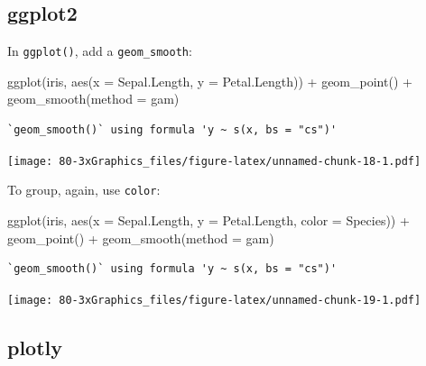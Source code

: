 \documentclass[
]{book}
\newenvironment{Shaded}{\begin{snugshade}}{\end{snugshade}}
\newcommand{\AttributeTok}[1]{\textcolor[rgb]{0.77,0.63,0.00}{#1}}
\newcommand{\FunctionTok}[1]{\textcolor[rgb]{0.00,0.00,0.00}{#1}}
\newcommand{\NormalTok}[1]{#1}
\newcommand{\SpecialCharTok}[1]{\textcolor[rgb]{0.00,0.00,0.00}{#1}}
\newcommand{\StringTok}[1]{\textcolor[rgb]{0.31,0.60,0.02}{#1}}
\begin{document}
\hypertarget{ggplot2-2}{%
\subsection{\texorpdfstring{\textbf{ggplot2}}{ggplot2}}\label{ggplot2-2}}

In \texttt{ggplot()}, add a \texttt{geom\_smooth}:

\begin{Shaded}
\begin{Highlighting}[]
\FunctionTok{ggplot}\NormalTok{(iris, }\FunctionTok{aes}\NormalTok{(}\AttributeTok{x =}\NormalTok{ Sepal.Length, }\AttributeTok{y =}\NormalTok{ Petal.Length)) }\SpecialCharTok{+}
  \FunctionTok{geom\_point}\NormalTok{() }\SpecialCharTok{+}
  \FunctionTok{geom\_smooth}\NormalTok{(}\AttributeTok{method =} \StringTok{\textquotesingle{}gam\textquotesingle{}}\NormalTok{)}
\end{Highlighting}
\end{Shaded}

\begin{verbatim}
`geom_smooth()` using formula 'y ~ s(x, bs = "cs")'
\end{verbatim}

\texttt{[image: 80-3xGraphics\_files/figure-latex/unnamed-chunk-18-1.pdf]}

To group, again, use \texttt{color}:

\begin{Shaded}
\begin{Highlighting}[]
\FunctionTok{ggplot}\NormalTok{(iris, }\FunctionTok{aes}\NormalTok{(}\AttributeTok{x =}\NormalTok{ Sepal.Length, }\AttributeTok{y =}\NormalTok{ Petal.Length, }\AttributeTok{color =}\NormalTok{ Species)) }\SpecialCharTok{+}
  \FunctionTok{geom\_point}\NormalTok{() }\SpecialCharTok{+}
  \FunctionTok{geom\_smooth}\NormalTok{(}\AttributeTok{method =} \StringTok{\textquotesingle{}gam\textquotesingle{}}\NormalTok{)}
\end{Highlighting}
\end{Shaded}

\begin{verbatim}
`geom_smooth()` using formula 'y ~ s(x, bs = "cs")'
\end{verbatim}

\texttt{[image: 80-3xGraphics\_files/figure-latex/unnamed-chunk-19-1.pdf]}

\hypertarget{plotly-1}{%
\subsection{\texorpdfstring{\textbf{plotly}}{plotly}}\label{plotly-1}}
\end{document}

